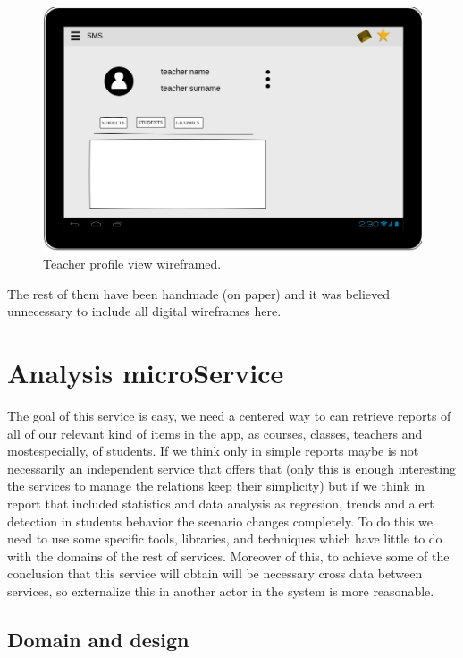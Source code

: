 \begin{figure}[H]
  \includegraphics[scale=0.2]{img/snaps/teacher_profile_wireframe.png}
  \centering
  \caption{Teacher profile view wireframed.}
\end{figure}

\noindent The rest of them have been handmade (on paper) and it was believed unnecessary
to include all digital wireframes here.

\section{Analysis microService}

The goal of this service is easy, we need a centered way to can retrieve reports
of all of our relevant kind of items in the app, as courses, classes, teachers and
mostespecially, of students.
If we think only in simple reports maybe is not necessarily an independent service
that offers that (only this is enough interesting the services to manage the
relations keep their simplicity) but if we think in report that included statistics
and data analysis as regresion, trends and alert detection in students behavior
the scenario changes completely.
\intro
To do this we need to use some specific tools,
libraries, and techniques which have little to do with  the domains of the rest
of services. Moreover of this, to achieve some of the conclusion that this service
will obtain will be necessary cross data between services, so externalize this in
another actor in the system is more reasonable.

\subsection{Domain and design}

